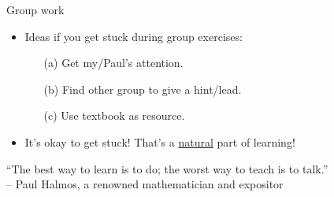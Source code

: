 \documentclass[10pt]{beamer}
\begin{document}
\begin{frame}{Group work}


\begin{myyellowbox}[title=Announcements about group work]
\begin{itemize}
	\item Ideas if you get stuck during group exercises:
	\begin{itemize}
	\item[(a)] Get my/Paul's attention. 
	\item[(b)] Find other group to give a hint/lead.
	\item[(c)] Use textbook as resource.
	\end{itemize} 
	\item It's okay to get stuck! That's a \underline{natural} part of learning!
\end{itemize}	
\end{myyellowbox}
\vfill 
\begin{mygreenbox}[title=Quote of the Semester]
“The best way to learn is to do; the worst way to teach is to talk.” \\

-- Paul Halmos, a renowned mathematician and expositor
\end{mygreenbox}

\end{frame}
\end{document}
